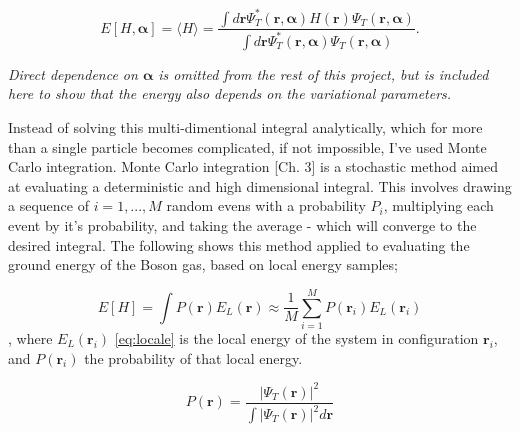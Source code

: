 \documentclass[%
oneside,                 %
final,                   %
10pt]{article}
\begin{document}
\begin{equation}
E[H,\bm \alpha] = \langle H \rangle = \frac{\int d \bm r \Psi_T^* ( \bm r,\bm \alpha) H(\bm r) \Psi_T ( \bm r, \bm \alpha)}{\int d \bm r \Psi_T^* ( \bm r, \bm \alpha) \Psi_T ( \bm r, \bm \alpha)}.
\label{eq:E_local_withintegral}
\end{equation}

\textit{Direct dependence on $\bm \alpha$ is omitted from the rest of this project, but is included here to show that the energy also depends on the variational parameters.}

Instead of solving this multi-dimentional integral analytically, which for more than a single particle becomes complicated, if not impossible, I've used Monte Carlo integration. Monte Carlo integration \citep{CMP}[Ch. 3] is a stochastic method aimed at evaluating a deterministic and high dimensional integral. This involves drawing a sequence of $i=1,...,M$ random evens with a probability $P_i$, multiplying each event by it's probability, and taking the average - which will converge to the desired integral. The following shows this method applied to evaluating the ground energy of the Boson gas, based on local energy samples;

\begin{equation}
E[H]=\int P(\bm r) E_L(\bm r) \approx \frac{1}{M}\sum_{i=1}^M P(\bm r_i) E_L(\bm r_i)
\end{equation}
, where $E_L(\bm r_i)$ \eqref{eq:locale} is the local energy of the system in configuration $\bm r_i$, and $P(\bm r_i)$ the probability of that local energy.

\begin{equation}
P(\bm r)=\frac{|\Psi_T (\bm r) |^2}{\int |\Psi_T (\bm r)|^2 d\bm r }
\label{eq:PDF}
\end{equation}
\end{document}
